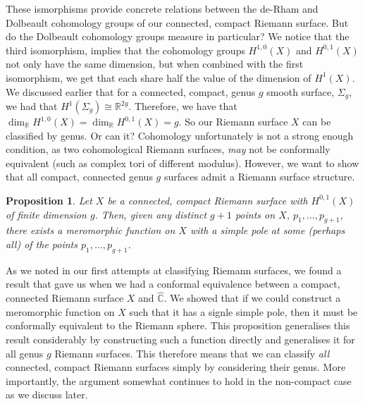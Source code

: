 \documentclass[11pt]{report}
\newtheorem{prop}[thm]{Proposition}
\theoremstyle{definition}
\begin{document}
These ismorphisms provide concrete relations between the de-Rham and Dolbeault cohomology groups of our connected, compact Riemann surface. But do the Dolbeault cohomology groups measure in particular? We notice that the third isomorphism, implies that the cohomology groups $H^{1,0}(X)$ and $H^{0,1}(X)$ not only have the same dimension, but when combined with the first isomorphism, we get that each share half the value of the dimension of $H^1(X)$. We discussed earlier that for a connected, compact, genus $g$ smooth surface, $\Sigma_g$, we had that $H^1(\Sigma_g)\cong\mathbb{R}^{2g}$. Therefore, we have that $\dim_{\mathbb{R}}H^{1,0}(X)=\dim_{\mathbb{R}}H^{0,1}(X)=g$. So our Riemann surface $X$ can be classified by genus. Or can it? Cohomology unfortunately is not a strong enough condition, as two cohomological Riemann surfaces, \emph{may} not be conformally equivalent (such as complex tori of different modulus). However, we want to show that all compact, connected genus $g$ surfaces admit a Riemann surface structure.
\begin{prop}\label{meroFunctionOnGenusGSurface}
  Let $X$ be a connected, compact Riemann surface with $H^{0,1}(X)$ of finite dimension $g$. Then, given any distinct $g+1$ points on $X$, $p_1,\ldots, p_{g+1}$, there exists a meromorphic function on $X$ with a simple pole at some (perhaps all) of the points $p_1,\ldots, p_{g+1}$.
\end{prop} 
As we noted in our first attempts at classifying Riemann surfaces, we found a result that gave us when we had a conformal equivalence between a compact, connected Riemann surface $X$ and $\widehat{\mathbb{C}}$. We showed that if we could construct a meromorphic function on $X$ such that it has a signle simple pole, then it must be conformally equivalent to the Riemann sphere. This proposition generalises this result considerably by constructing such a function directly and generalises it for all genus $g$ Riemann surfaces. This therefore means that we can classify \emph{all} connected, compact Riemann surfaces simply by considering their genus. More importantly, the argument somewhat continues to hold in the non-compact case as we discuss later.
\end{document}

